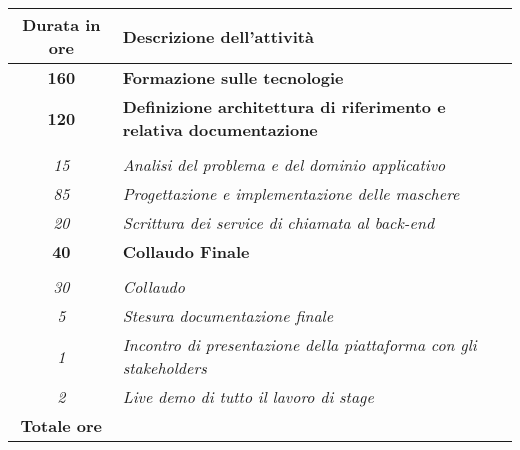 

\begin{tabularx}{\textwidth}{|c|X|}
	\hline
	\textbf{Durata in ore} & \textbf{Descrizione dell'attività} \\\hline
	
	\textbf{160} & \textbf{Formazione sulle tecnologie} \\	 
    \hline
    
    \textbf{120} & \textbf{Definizione architettura di riferimento e relativa documentazione} \\ \hdashline 
    \multirow{3}{0cm}\\ 
    \textit{15} & 
    \textit{Analisi del problema e del dominio applicativo} \\
    \textit{85} & 
    \textit{Progettazione e implementazione delle maschere} \\
    \textit{20} & 
    \textit{Scrittura dei service di chiamata al back-end} \\
    \hline
    
    \textbf{40} & \textbf{Collaudo Finale}  \\ \hdashline 
    \multirow{4}{0cm}\\ 
    \textit{30} & 
    \textit{Collaudo} \\
    \textit{5} & 
    \textit{Stesura documentazione finale} \\
    \textit{1} & 
    \textit{Incontro di presentazione della piattaforma con gli stakeholders} \\
    \textit{2} & 
    \textit{Live demo di tutto il lavoro di stage} \\
    \hline
	
	\textbf{Totale ore} & \multicolumn{1}{|c|}{\textbf{\totaleOre}} \\\hline
	
	
\end{tabularx}
